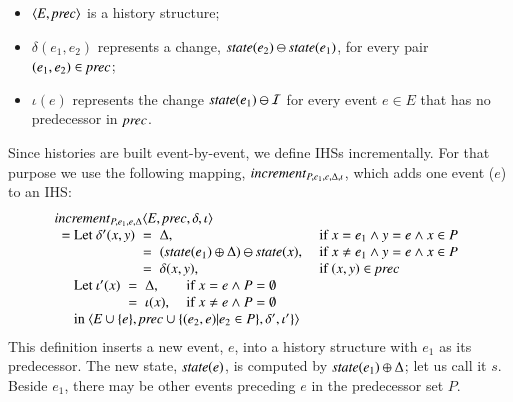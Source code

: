 \documentclass{elsarticle}
\def\id#1{\text{\em #1\/}}
\def\Events{{\mathit E}}
\begin{document}
\begin{itemize}
\item	$\la \Events, \id{prec}\ra$ is a history structure;
\item	$\delta(e_1,e_2)$ represents a change, $\id{state}(e_2)\ominus\id{state}(e_1)$, for every pair $(e_1,e_2)\in\id{prec}$;
\item	$\iota(e)$ represents the change $\id{state}(e_1)\ominus\mathcal I$ for every event $e\in\Events$ that has no predecessor in $\id{prec}$.
\end{itemize}
	Since histories are built event-by-event, we define IHSs incrementally.
	For that purpose we use the following mapping, $\id{increment}_{P,e_1,e,\Delta,\iota}$,
	which adds one event ($e$) to an IHS:
\begin{eqnarray}
\begin{array}{l@{}l}
	\multicolumn{2}{l}{\id{increment}_{P,e_1,e,\Delta}\la\Events, \id{prec}, \delta, \iota\ra}\\
	\ \ =\ &\begin{array}[t]{@{}l@{\hspace{0.2cm}}c@{\hspace{0.2cm}}ll}
		\text{Let }\delta'(x,y)&=&\Delta\text{, }&\text{if }x=e_1\wedge y=e\wedge x\in P\\
				       &=&(\id{state}(e_1)\oplus\Delta)\ominus\id{state}(x)\text{, }&\text{if }x\neq e_1\wedge y=e\wedge x\in P\\
				       &=&\delta(x,y)\text{, }&\text{if }(x,y)\in\id{prec}
		\end{array}\\
		&\begin{array}[t]{@{}l@{\hspace{0.2cm}}c@{\hspace{0.2cm}}ll}
			\text{Let }\iota'(x)&=&\Delta\text{, }&\text{if }x=e\wedge P=\emptyset\\
				    &=&\iota(x)\text{, }&\text{if }x\neq e\wedge P=\emptyset
		\end{array}\\
		&\text{in }\la\Events\cup\{e\}, \id{prec}\cup\{(e_2,e)|e_2\in P\}, \delta', \iota'\}\ra
\end{array}
\label{req:increment}
\end{eqnarray}
	This definition inserts a new event, $e$, into a history structure with $e_1$ as its predecessor.
	The new state, $\id{state}(e)$, is computed by $\id{state}(e_1)\oplus\Delta$; let us call it $s$.
	Beside $e_1$, there may be other events preceding $e$ in the predecessor set $P$.
\end{document}
